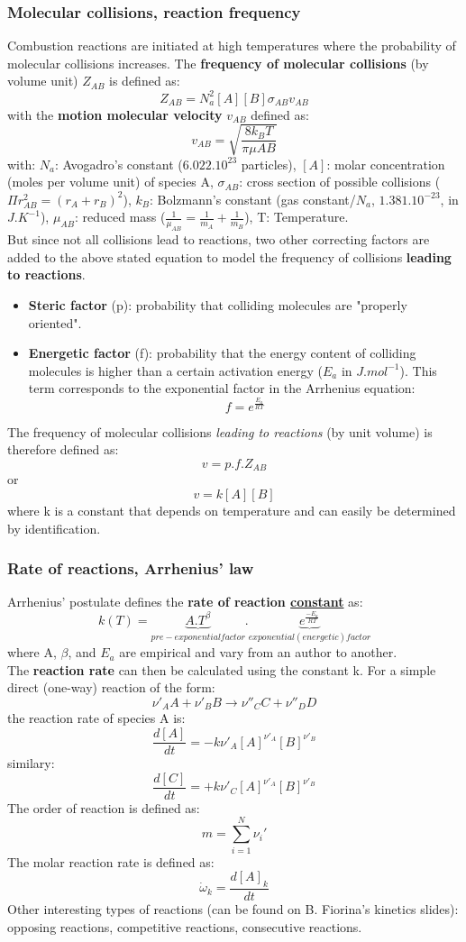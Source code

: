 \documentclass[a4paper,11pt]{article}
\begin{document}
\subsubsection{Molecular collisions, reaction frequency}
Combustion reactions are initiated at high temperatures where the probability of molecular collisions increases. The \textbf{frequency of molecular collisions} (by volume unit) $Z_{AB}$ is defined as:
\[Z_{AB} = N_a^2 [A] [B] \sigma_{AB} v_{AB}\]
with the \textbf{motion molecular velocity} $v_{AB}$ defined as:
\[v_{AB}=\sqrt{\frac{8k_B T}{\pi \mu{AB}}}\]
with: $N_{a}$: Avogadro's constant ($6.022.10^{23}$ particles), $[A]$: molar concentration (moles per volume unit) of species A, $\sigma_{AB}$: cross section of possible collisions ($\Pi r_{AB}^2=(r_A+r_B)^2$), $k_B$: Bolzmann's constant (gas constant/$N_a$, $1.381.10^{-23}$, in $J.K^{-1}$), $\mu_{AB}$: reduced mass ($\frac{1}{\mu_{AB}}=\frac{1}{m_A}+\frac{1}{m_B}$), T: Temperature.\\
But since not all collisions lead to reactions, two other correcting factors are added to the above stated equation to model the frequency of collisions \textbf{leading to reactions}.
\begin{itemize}
\item \textbf{Steric factor} (p): probability that colliding molecules are "properly oriented".
\item \textbf{Energetic factor} (f): probability that the energy content of colliding molecules is higher than a certain activation energy ($E_a$ in $J.mol^{-1}$). This term corresponds to the exponential factor in the Arrhenius equation:
\[f=e^\frac{E_a}{RT}\]
\end{itemize}
The frequency of molecular collisions \emph{leading to reactions} (by unit volume) is therefore defined as:
\[v = p.f.Z_{AB}\]
or
\[v = k[A][B]\]
where k is a constant that depends on temperature and can easily be determined by identification.
\subsubsection{Rate of reactions, Arrhenius' law}
Arrhenius' postulate defines the \textbf{rate of reaction \underline{constant}} as:
\[k(T) = \underbrace{A.T^\beta}_{pre-exponential factor}.\underbrace{e^\frac{-E_a}{RT}}_{exponential (energetic) factor}\]
where A, $\beta$, and $E_a$ are empirical and vary from an author to another.\\
The \textbf{reaction rate} can then be calculated using the constant k. For a simple direct (one-way) reaction of the form:
\[\nu'_A A + \nu'_B B \rightarrow \nu''_C C + \nu''_D D\]
the reaction rate of species A is:
\[\frac{d[A]}{dt} = - k \nu'_A [A]^{\nu'_A} [B]^{\nu'_B}\]
similary:
\[\frac{d[C]}{dt} = +k \nu'_C [A]^{\nu'_A} [B]^{\nu'_B}\]
The order of reaction is defined as:
\[m=\sum_{i=1}^{N}\nu_i'\]
The molar reaction rate is defined as:
\[\dot{\omega}_k = \frac{d[A]_k}{dt}\]
Other interesting types of reactions (can be found on B. Fiorina's kinetics slides): opposing reactions, competitive reactions, consecutive reactions.
\pagebreak
\end{document}
